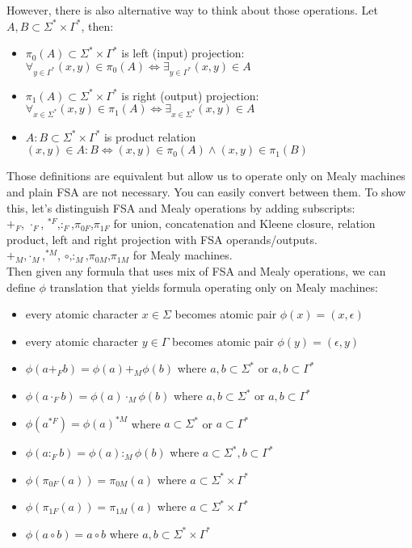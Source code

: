 \documentclass[12pt]{article}
\begin{document}
However, there is also alternative way to think about those operations. Let $A,B \subset \Sigma^* \times \Gamma^*$, then:
 \begin{itemize}
 	\item $\pi_0(A) \subset \Sigma^* \times \Gamma^*$ is left (input) projection: $\forall_{y\in\Gamma^*} (x,y) \in \pi_0(A) \iff \exists_{y\in\Gamma^*} (x,y) \in A$
 	\item $\pi_1(A) \subset \Sigma^* \times \Gamma^*$ is right (output) projection: $\forall_{x\in\Sigma^*} (x,y) \in \pi_1(A) \iff \exists_{x\in\Sigma^*} (x,y) \in A$
 	\item $A:B \subset \Sigma^* \times \Gamma^*$ is product relation $(x,y)\in A:B \iff (x,y)\in \pi_0(A)\wedge (x,y)\in \pi_1(B)$
 \end{itemize}
Those definitions are equivalent but allow us to operate only on Mealy machines and plain FSA are not necessary. You can easily convert between them. To show this, let's distinguish FSA and Mealy operations by adding subscripts: \\
$+_F$, $\cdot_F$, $^{*F}$,$:_F$,$\pi_{0F}$,$\pi_{1F}$ for union, concatenation and Kleene closure, relation product, left and right projection with FSA operands/outputs.\\ 
$+_M$,$\cdot_M$,$^{*M}$, $\circ$,$:_M$,$\pi_{0M}$,$\pi_{1M}$ for Mealy machines. \\
Then given any formula that uses mix of FSA and Mealy operations, we can define $\phi$ translation that yields formula operating only on Mealy machines:
\begin{itemize}
	\item every atomic character $x\in\Sigma$ becomes atomic pair $\phi(x) = (x,\epsilon)$
	\item every atomic character $y\in\Gamma$ becomes atomic pair $\phi(y) = (\epsilon,y)$
	\item $\phi(a+_Fb) = \phi(a)+_M\phi(b)$ where $a,b\subset \Sigma^*$ or $a,b\subset \Gamma^*$
	\item $\phi(a\cdot_Fb) = \phi(a)\cdot_M\phi(b)$ where $a,b\subset \Sigma^*$ or $a,b\subset \Gamma^*$
	\item $\phi(a^{*F}) = \phi(a)^{*M}$ where $a\subset \Sigma^*$ or $a\subset \Gamma^*$
	\item $\phi(a:_Fb) = \phi(a):_M\phi(b)$ where $a\subset \Sigma^*,b\subset\Gamma^*$
    \item $\phi(\pi_{0F}(a)) = \pi_{0M}(a)$ where $a\subset \Sigma^* \times \Gamma^*$
    \item $\phi(\pi_{1F}(a)) = \pi_{1M}(a)$ where $a\subset \Sigma^* \times \Gamma^*$
    \item $\phi(a\circ b) = a\circ b$ where $a,b\subset \Sigma^* \times \Gamma^*$
\end{itemize} 
\end{document}
